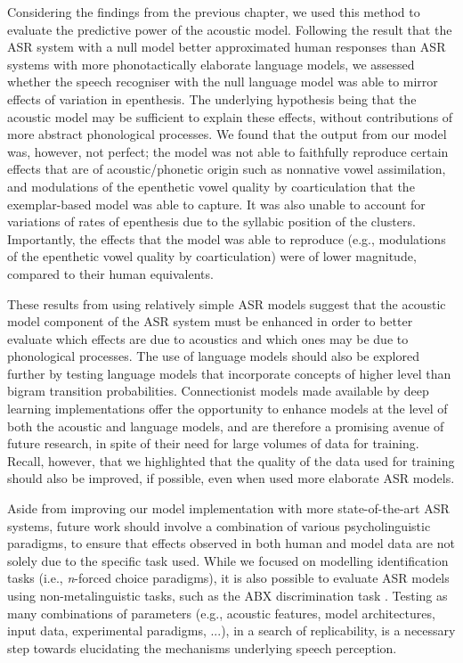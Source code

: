Considering the findings from the previous chapter, we used this method to evaluate the predictive power of the acoustic model. Following the result that the ASR system with a null model better approximated human responses than ASR systems with more phonotactically elaborate language models, we assessed whether the speech recogniser with the null language model was able to mirror effects of variation in epenthesis. The underlying hypothesis being that the acoustic model may be sufficient to explain these effects, without contributions of more abstract phonological processes. We found that the output from our model was, however, not perfect; the model was not able to faithfully reproduce certain effects that are of acoustic/phonetic origin such as nonnative vowel assimilation, and modulations of the epenthetic vowel quality by coarticulation that the exemplar-based model was able to capture. It was also unable to account for variations of rates of epenthesis due to the syllabic position of the clusters. Importantly, the effects that the model was able to reproduce (e.g., modulations of the epenthetic vowel quality by  coarticulation) were of lower magnitude, compared to their human equivalents. 

These results from using relatively simple ASR models suggest that the acoustic model component of the ASR system must be enhanced in order to better evaluate which effects are due to acoustics and which ones may be due to phonological processes.
The use of language models should also be explored further by testing language models that incorporate concepts of higher level than bigram transition probabilities.
Connectionist models made available by deep learning implementations offer the opportunity to enhance models at the level of both the acoustic and language models, and are therefore a promising avenue of future research, in spite of their need for large volumes of data for training. Recall, however, that we highlighted that the quality of the data used for training should also be improved, if possible, even when used more elaborate ASR models.

Aside from improving our model implementation with more state-of-the-art ASR systems, future work should involve a combination of various psycholinguistic paradigms, to ensure that effects observed in both human and model data are not solely due to the specific task used. While we focused on modelling identification tasks (i.e., \textit{n}-forced choice paradigms), it is also possible to evaluate ASR models using non-metalinguistic tasks, such as the ABX discrimination task \cite{schatz2018}. Testing as many combinations of parameters (e.g., acoustic features, model architectures, input data, experimental paradigms, ...), in a search of replicability, is a necessary step towards elucidating the mechanisms underlying speech perception.\\

